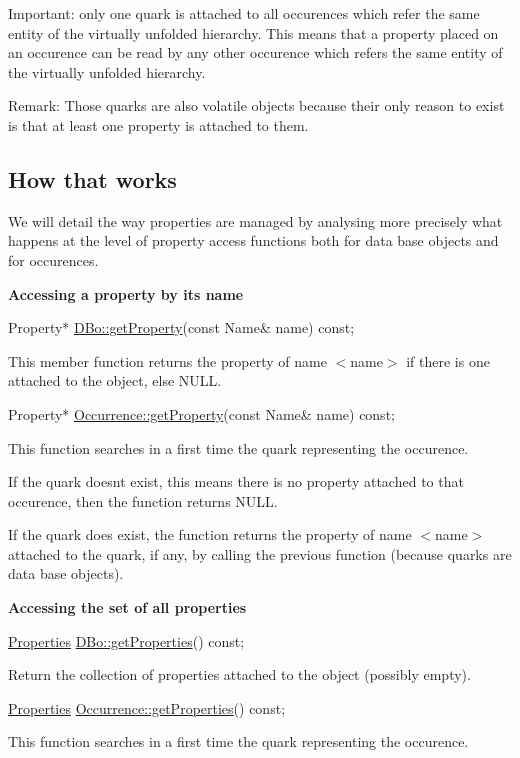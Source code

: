 \begin{DoxyParagraph}{Important\+:}
only one quark is attached to all occurences which refer the same entity of the virtually unfolded hierarchy. This means that a property placed on an occurence can be read by any other occurence which refers the same entity of the virtually unfolded hierarchy.
\end{DoxyParagraph}
\begin{DoxyParagraph}{Remark\+:}
Those quarks are also volatile objects because their only reason to exist is that at least one property is attached to them.
\end{DoxyParagraph}
\hypertarget{classHurricane_1_1Property_secPropertyHowThatWorks}{}\subsection{How that works}\label{classHurricane_1_1Property_secPropertyHowThatWorks}
We will detail the way properties are managed by analysing more precisely what happens at the level of property access functions both for data base objects and for occurences.

{\bfseries Accessing a property by its name} 
\begin{DoxyCode}
Property* \hyperlink{classHurricane_1_1DBo_a599f61978df51d1d4c351f6cbd02488d}{DBo::getProperty}(\textcolor{keyword}{const} Name& name) \textcolor{keyword}{const};
\end{DoxyCode}
 This member function returns the property of name {\ttfamily $<$name$>$} if there is one attached to the object, else N\+U\+LL. 
\begin{DoxyCode}
Property* \hyperlink{classHurricane_1_1Occurrence_ab2b36b219037a2310f6527a35a9a266f}{Occurrence::getProperty}(\textcolor{keyword}{const} Name& name) \textcolor{keyword}{const};
\end{DoxyCode}
 This function searches in a first time the quark representing the occurence.

If the quark doesn\textquotesingle{}t exist, this means there is no property attached to that occurence, then the function returns N\+U\+LL.

If the quark does exist, the function returns the property of name {\ttfamily $<$name$>$} attached to the quark, if any, by calling the previous function (because quarks are data base objects).

{\bfseries Accessing the set of all properties} 
\begin{DoxyCode}
\hyperlink{namespaceHurricane_afd7bca6dad4be54b7c03b0463e6c0004}{Properties}  \hyperlink{classHurricane_1_1DBo_aec46894a10e83abb54c495dc4d90f2d3}{DBo::getProperties}() \textcolor{keyword}{const};
\end{DoxyCode}
 Return the collection of properties attached to the object (possibly empty). 
\begin{DoxyCode}
\hyperlink{namespaceHurricane_afd7bca6dad4be54b7c03b0463e6c0004}{Properties}  \hyperlink{classHurricane_1_1Occurrence_acbf59d6c01804e01f66d076c149abb49}{Occurrence::getProperties}() \textcolor{keyword}{const};
\end{DoxyCode}
 This function searches in a first time the quark representing the occurence.

